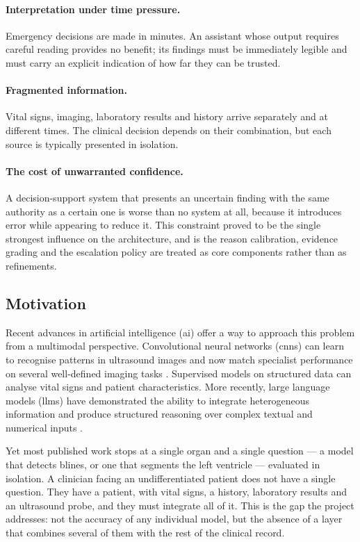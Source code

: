 \paragraph{Interpretation under time pressure.} Emergency decisions are made in minutes.
An assistant whose output requires careful reading provides no benefit; its findings must
be immediately legible and must carry an explicit indication of how far they can be
trusted.

\paragraph{Fragmented information.} Vital signs, imaging, laboratory results and history
arrive separately and at different times. The clinical decision depends on their
combination, but each source is typically presented in isolation.

\paragraph{The cost of unwarranted confidence.} A decision-support system that presents an
uncertain finding with the same authority as a certain one is worse than no system at all,
because it introduces error while appearing to reduce it. This constraint proved to be the
single strongest influence on the architecture, and is the reason \gls{calibration},
evidence grading and the escalation policy are treated as core components rather than as
refinements.

\subsection{Motivation}
\label{subsec:motivation}

Recent advances in artificial intelligence (\gls{ai}) offer a way to approach this problem
from a multimodal perspective. Convolutional neural networks (\glspl{cnn}) can learn to
recognise patterns in ultrasound images and now match specialist performance on several
well-defined imaging tasks \cite{leclerc2019camus, isensee2021nnunet}. Supervised models
on structured data can analyse vital signs and patient characteristics. More recently,
large language models (\glspl{llm}) have demonstrated the ability to integrate
heterogeneous information and produce structured reasoning over complex textual and
numerical inputs \cite{chen2024huatuogpto1}.

Yet most published work stops at a single organ and a single question --- a model that
detects \gls{blines}, or one that segments the left ventricle --- evaluated in isolation.
A clinician facing an undifferentiated patient does not have a single question. They have
a patient, with vital signs, a history, laboratory results and an ultrasound probe, and
they must integrate all of it. This is the gap the project addresses: not the accuracy of
any individual model, but the absence of a layer that combines several of them with the
rest of the clinical record.


